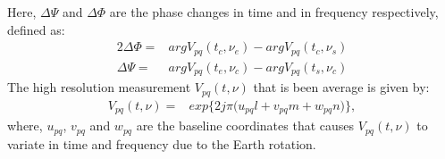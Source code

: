 Here, $\Delta \Psi$ and $\Delta \Phi$ are the phase changes in time and in frequency respectively, defined as:
\begin{alignat}{2}
\Delta \Phi=&arg V_{pq}(t_{c},\nu_{e})-arg V_{pq}(t_{c},\nu_{s})\\
\Delta \Psi=&arg V_{pq}(t_{e},\nu_{c})-arg V_{pq}(t_{s},\nu_{c})
\end{alignat}
The high resolution measurement $V_{pq}(t,\nu)$ that is been average is given by:
\begin{eqnarray}
 V_{pq}(t, \nu)=& exp\bigg\{2j\pi\big(u_{pq}l+v_{pq}m+ w_{pq}n\big)\bigg\}\label{eq:hiresvisibilities},
\end{eqnarray}
where, $u_{pq}$, $v_{pq}$ and $w_{pq}$ are the baseline coordinates that causes $V_{pq}(t,\nu)$ to variate in time and frequency due to the 
Earth 
rotation.\\
% 
